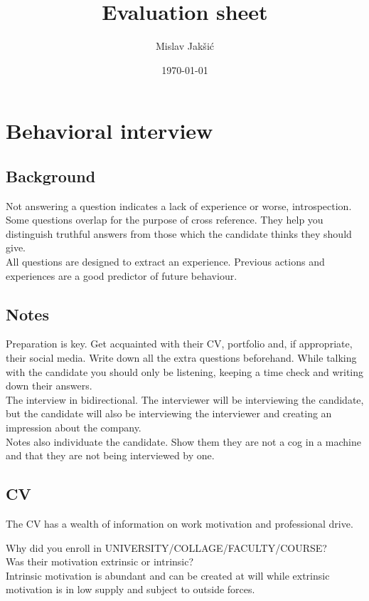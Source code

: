 \documentclass{article}
\title{Evaluation sheet}
\author{Mislav Jakšić}
\date{\today}
\begin{document}
\maketitle



\section{Behavioral interview}


\subsection{Background}

Not answering a question indicates a lack of experience or worse, introspection. \\
Some questions overlap for the purpose of cross reference. They help you distinguish truthful answers from those which the candidate thinks they should give. \\
All questions are designed to extract an experience. Previous actions and experiences are a good predictor of future behaviour.


\subsection{Notes}

Preparation is key. Get acquainted with their CV, portfolio and, if appropriate, their social media. Write down all the extra questions beforehand. While talking with the candidate you should only be listening, keeping a time check and writing down their answers. \\
The interview in bidirectional. The interviewer will be interviewing the candidate, but the candidate will also be interviewing the interviewer and creating an impression about the company. \\
Notes also individuate the candidate. Show them they are not a cog in a machine and that they are not being interviewed by one.


\subsection{CV}

The CV has a wealth of information on work motivation and professional drive.

Why did you enroll in UNIVERSITY/COLLAGE/FACULTY/COURSE? \\
Was their motivation extrinsic or intrinsic? \\
Intrinsic motivation is abundant and can be created at will while extrinsic motivation is in low supply and subject to outside forces.
\end{document}
